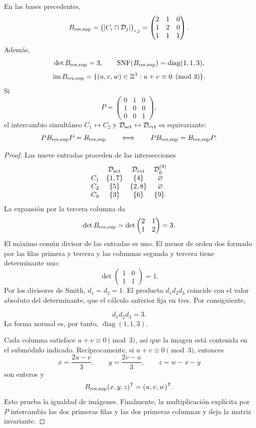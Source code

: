 \begin{theorem}
\label{thm:incidencia-residuo-soporte}
En las bases precedentes,
\[
 B_{\rm res,sup}
 =\bigl(|C_i\cap\mathcal D_j|\bigr)_{i,j}
 =
 \begin{pmatrix}
 2&1&0\\
 1&2&0\\
 1&1&1
 \end{pmatrix}.
\]
Además,
\[
 \det B_{\rm res,sup}=3,\qquad
 \operatorname{SNF}(B_{\rm res,sup})
 =\operatorname{diag}(1,1,3),
\]
\[
 \operatorname{im}B_{\rm res,sup}
 =\{(u,v,w)\in\mathbb Z^3:u+v\equiv0\pmod3\}.
\]
Si
\[
 P=\begin{pmatrix}0&1&0\\1&0&0\\0&0&1\end{pmatrix},
\]
el intercambio simultáneo
\(C_1\leftrightarrow C_2\) y
\(\mathcal D_{\rm act}\leftrightarrow\mathcal D_{\rm evt}\) es equivariante:
\[
 P B_{\rm res,sup}P=B_{\rm res,sup}
 \qquad\Longleftrightarrow\qquad
 PB_{\rm res,sup}=B_{\rm res,sup}P.
\]
\end{theorem}

\begin{proof}
Las nueve entradas proceden de las intersecciones
\[
\begin{array}{cccc}
 &\mathcal D_{\rm act}&\mathcal D_{\rm evt}
 &\mathcal D_{\bar0}^{(9)}\\
 C_1&\{1,7\}&\{4\}&\varnothing\\
 C_2&\{5\}&\{2,8\}&\varnothing\\
 C_0&\{3\}&\{6\}&\{9\}.
\end{array}
\]
La expansión por la tercera columna da
\[
 \det B_{\rm res,sup}
 =\det\begin{pmatrix}2&1\\1&2\end{pmatrix}=3.
\]
El máximo común divisor de las entradas es uno. El menor de orden dos
formado por las filas primera y tercera y las columnas segunda y tercera
tiene determinante uno:
\[
 \det\begin{pmatrix}1&0\\1&1\end{pmatrix}=1.
\]
Por los divisores de Smith, \(d_1=d_2=1\). El producto
\(d_1d_2d_3\) coincide con el valor absoluto del determinante, que el
cálculo anterior fija en tres. Por consiguiente,

\[
 d_1d_2d_3=3.
\]
La forma normal es, por tanto, \(\operatorname{diag}(1,1,3)\).

Cada columna satisface \(u+v\equiv0\pmod3\), así que la imagen está contenida
en el submódulo indicado. Recíprocamente, si \(u+v\equiv0\pmod3\), entonces
\[
 x=\frac{2u-v}{3},\qquad
 y=\frac{2v-u}{3},\qquad
 z=w-x-y
\]
son enteros y
\[
 B_{\rm res,sup}(x,y,z)^{\mathsf T}=(u,v,w)^{\mathsf T}.
\]
Esto prueba la igualdad de imágenes. Finalmente, la multiplicación explícita
por \(P\) intercambia las dos primeras filas y las dos primeras columnas y
deja la matriz invariante.
\end{proof}

